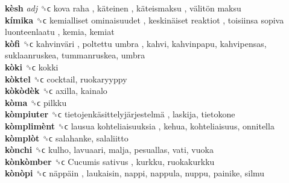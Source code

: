 \textbf{kèsh} \emph{adj}  ␝ϲ   kova raha ,  käteinen ,  käteismaksu ,  välitön maksu   \\
\textbf{kímika} ␝ϲ   kemialliset ominaisuudet ,  keskinäiset reaktiot ,  toisiinsa sopiva luonteenlaatu , kemia, kemiat  \\
\textbf{kòfi} ␝ϲ   kahvinväri ,  poltettu umbra , kahvi, kahvinpapu, kahvipensas, suklaanruskea, tummanruskea, umbra  \\
\textbf{kòki} ␝ϲ  kokki  \\
\textbf{kòktel} ␝ϲ  cocktail, ruokaryyppy  \\
\textbf{kòkòdèk} ␝ϲ  axilla, kainalo  \\
\textbf{kòma} ␝ϲ  pilkku  \\
\textbf{kòmpiuter} ␝ϲ   tietojenkäsittelyjärjestelmä , laskija, tietokone  \\
\textbf{kòmplimènt} ␝ϲ   lausua kohteliaisuuksia , kehua, kohteliaisuus, onnitella  \\
\textbf{kòmplòt} ␝ϲ  salahanke, salaliitto  \\
\textbf{kònchi} ␝ϲ  kulho, lavuaari, malja, pesuallas, vati, vuoka  \\
\textbf{kònkòmber} ␝ϲ   Cucumis sativus , kurkku, ruokakurkku  \\
\textbf{kònòpi} ␝ϲ   näppäin , laukaisin, nappi, nappula, nuppu, painike, silmu  \\

